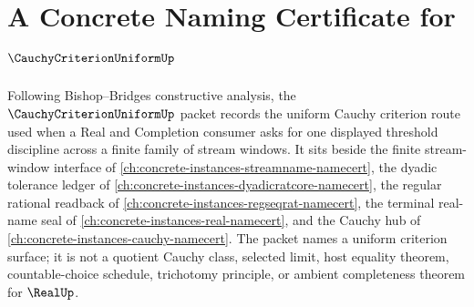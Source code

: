 \chapter{A Concrete Naming Certificate for $\CauchyCriterionUniformUp$}
\label{ch:concrete-instances-cauchy-criterion-uniform-namecert}

Following Bishop--Bridges constructive analysis, the $\CauchyCriterionUniformUp$ packet records the uniform Cauchy criterion route used when a Real and Completion consumer asks for one displayed threshold discipline across a finite family of stream windows. It sits beside the finite stream-window interface of \autoref{ch:concrete-instances-streamname-namecert}, the dyadic tolerance ledger of \autoref{ch:concrete-instances-dyadicratcore-namecert}, the regular rational readback of \autoref{ch:concrete-instances-regseqrat-namecert}, the terminal real-name seal of \autoref{ch:concrete-instances-real-namecert}, and the Cauchy hub of \autoref{ch:concrete-instances-cauchy-namecert}. The packet names a uniform criterion surface; it is not a quotient Cauchy class, selected limit, host equality theorem, countable-choice schedule, trichotomy principle, or ambient completeness theorem for $\RealUp$.

